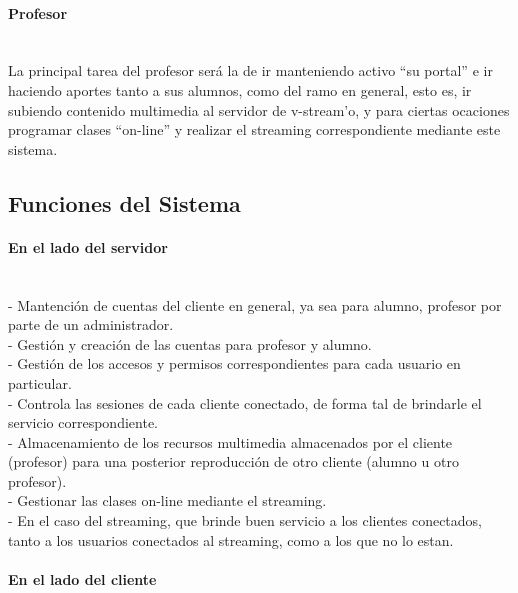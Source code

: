 \documentclass[12pt]{article}
\begin{document}
\paragraph{Profesor\\\\}

La principal tarea del profesor será la de ir manteniendo activo ``su portal'' e ir haciendo aportes
tanto a sus alumnos, como del ramo en general, esto es, ir subiendo contenido multimedia al servidor de 
v-stream'o, y para ciertas ocaciones programar clases ``on-line'' y realizar el streaming correspondiente
mediante este sistema.\\

\subsection{Funciones del Sistema}

\paragraph{En el lado del servidor\\\\}

-	Mantención de cuentas del cliente en general, ya sea para alumno, profesor por parte de un administrador.\\

-	Gestión y creación de las cuentas para profesor y alumno.\\

-	Gestión de los accesos y permisos correspondientes para cada usuario en particular.\\

-	Controla las sesiones de cada cliente conectado, de forma tal de brindarle el servicio correspondiente.\\

-	Almacenamiento de los recursos multimedia almacenados por el cliente (profesor) para una posterior
reproducción de otro cliente (alumno u otro profesor).\\

-	Gestionar las clases on-line mediante el streaming.\\

-	En el caso del streaming, que brinde buen servicio a los clientes conectados, tanto a los usuarios
conectados al streaming, como a los que no lo estan.\\

\paragraph{En el lado del cliente\\\\}
\end{document}
